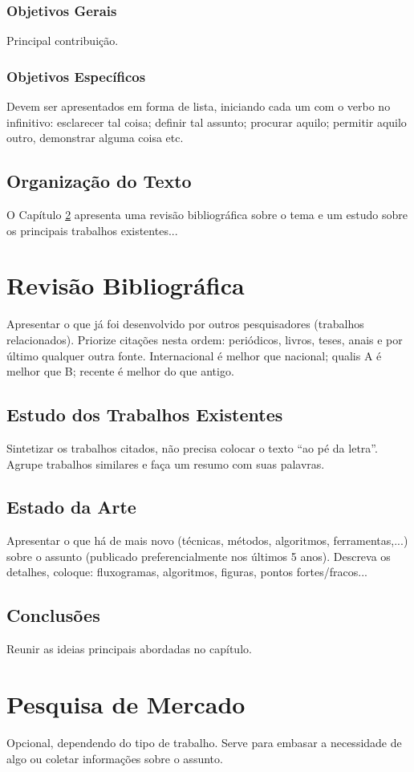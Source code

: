 \documentclass[openright]{ifrs} %
\begin{document}
\subsection{Objetivos Gerais}
Principal contribuição.
\subsection{Objetivos Específicos}
Devem ser apresentados em forma de lista, iniciando cada um com o verbo no infinitivo: esclarecer tal coisa; definir tal assunto; procurar aquilo; permitir aquilo outro, demonstrar alguma coisa etc.
\section{Organização do Texto}
O Capítulo \ref{cap:revbib} apresenta uma revisão bibliográfica sobre o tema e um estudo sobre os principais trabalhos existentes...

\chapter{Revisão Bibliográfica} \label{cap:revbib}
Apresentar o que já foi desenvolvido por outros pesquisadores (trabalhos relacionados). Priorize citações nesta ordem: periódicos, livros, teses, anais e por último qualquer outra fonte. Internacional é melhor que nacional; qualis A é melhor que B; recente é melhor do que antigo.
\section{Estudo dos Trabalhos Existentes}
Sintetizar os trabalhos citados, não precisa colocar o texto ``ao pé da letra''. Agrupe trabalhos similares e faça um resumo com suas palavras.
\section{Estado da Arte}
Apresentar o que há de mais novo (técnicas, métodos, algoritmos, ferramentas,...) sobre o assunto (publicado preferencialmente nos últimos 5 anos). Descreva os detalhes, coloque: fluxogramas, algoritmos, figuras, pontos fortes/fracos...
\section{Conclusões}
Reunir as ideias principais abordadas no capítulo.

\chapter{Pesquisa de Mercado}
Opcional, dependendo do tipo de trabalho. Serve para embasar a necessidade de algo ou coletar informações sobre o assunto. 
\end{document}
